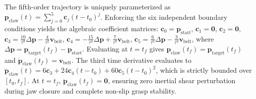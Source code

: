 \documentclass[journal]{IEEEtran}
\newenvironment{proof}{\begin{IEEEproof}}{\end{IEEEproof}}
\begin{document}
\begin{proof}
The fifth-order trajectory is uniquely parameterized as $\mathbf{p}_{\text{claw}}(t) = \sum_{j=0}^5 \mathbf{c}_j (t - t_0)^j$. Enforcing the six independent boundary conditions yields the algebraic coefficient matrices:
$\mathbf{c}_0 = \mathbf{p}_{\text{start}}$, $\mathbf{c}_1 = \mathbf{0}$, $\mathbf{c}_2 = \mathbf{0}$,
$\mathbf{c}_3 = \frac{10}{\tau^3} \Delta\mathbf{p} - \frac{4}{\tau^2} \mathbf{v}_{\text{belt}}$,
$\mathbf{c}_4 = -\frac{15}{\tau^4} \Delta\mathbf{p} + \frac{7}{\tau^3} \mathbf{v}_{\text{belt}}$,
$\mathbf{c}_5 = \frac{6}{\tau^5} \Delta\mathbf{p} - \frac{3}{\tau^4} \mathbf{v}_{\text{belt}}$,
where $\Delta\mathbf{p} = \mathbf{p}_{\text{target}}(t_f) - \mathbf{p}_{\text{start}}$. Evaluating at $t = t_f$ gives $\mathbf{p}_{\text{claw}}(t_f) = \mathbf{p}_{\text{target}}(t_f)$ and $\dot{\mathbf{p}}_{\text{claw}}(t_f) = \mathbf{v}_{\text{belt}}$. The third time derivative evaluates to $\dddot{\mathbf{p}}_{\text{claw}}(t) = 6\mathbf{c}_3 + 24\mathbf{c}_4(t - t_0) + 60\mathbf{c}_5(t - t_0)^2$, which is strictly bounded over $[t_0, t_f]$. At $t=t_f$, $\ddot{\mathbf{p}}_{\text{claw}}(t_f) = \mathbf{0}$, ensuring zero inertial shear perturbation during jaw closure and complete non-slip grasp stability.
\end{proof}
\end{document}
